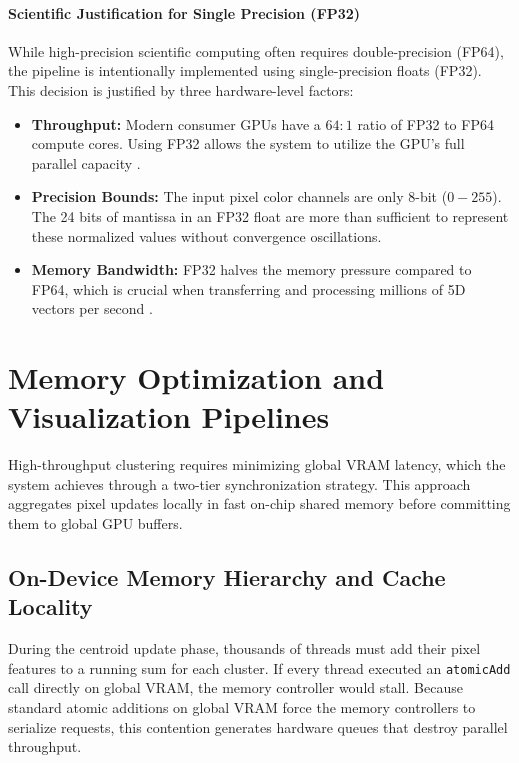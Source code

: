 \paragraph{Scientific Justification for Single Precision (FP32)}
While high-precision scientific computing often requires double-precision (FP64), the pipeline is intentionally implemented using single-precision floats (FP32). This decision is justified by three hardware-level factors:
\begin{itemize}
    \item \textbf{Throughput:} Modern consumer GPUs have a $64:1$ ratio of FP32 to FP64 compute cores. Using FP32 allows the system to utilize the GPU's full parallel capacity \cite{CudaGuide, cook2012cuda}.
    \item \textbf{Precision Bounds:} The input pixel color channels are only 8-bit ($0-255$). The 24 bits of mantissa in an FP32 float are more than sufficient to represent these normalized values without convergence oscillations.
    \item \textbf{Memory Bandwidth:} FP32 halves the memory pressure compared to FP64, which is crucial when transferring and processing millions of 5D vectors per second \cite{CudaGuide, cook2012cuda}.
\end{itemize}

\section{Memory Optimization and Visualization Pipelines}
High-throughput clustering requires minimizing global VRAM latency, which the system achieves through a two-tier synchronization strategy. This approach aggregates pixel updates locally in fast on-chip shared memory before committing them to global GPU buffers.

\subsection{On-Device Memory Hierarchy and Cache Locality}
During the centroid update phase, thousands of threads must add their pixel features to a running sum for each cluster. If every thread executed an \texttt{atomicAdd} call directly on global VRAM, the memory controller would stall. Because standard atomic additions on global VRAM force the memory controllers to serialize requests, this contention generates hardware queues that destroy parallel throughput.

